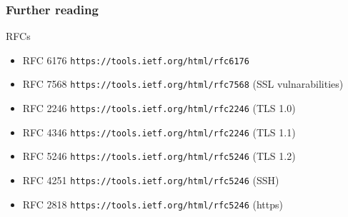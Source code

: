 \documentclass[10pt, hyperref={pdfpagelabels=false}]{beamer}
\begin{document}
\begin{frame}
\frametitle{Further reading}
RFCs
\begin{itemize}
\item RFC 6176 \texttt{\small\color{blue}https://tools.ietf.org/html/rfc6176}
\item RFC 7568 \texttt{\small\color{blue}https://tools.ietf.org/html/rfc7568} (SSL vulnarabilities)
\item RFC 2246 \texttt{\small\color{blue}https://tools.ietf.org/html/rfc2246} (TLS 1.0)
\item RFC 4346 \texttt{\small\color{blue}https://tools.ietf.org/html/rfc2246} (TLS 1.1)
\item RFC 5246 \texttt{\small\color{blue}https://tools.ietf.org/html/rfc5246} (TLS 1.2)
\item RFC 4251 \texttt{\small\color{blue}https://tools.ietf.org/html/rfc5246} (SSH)
\item RFC 2818 \texttt{\small\color{blue}https://tools.ietf.org/html/rfc5246} (https)
\end{itemize}
\end{frame}

\end{document}
